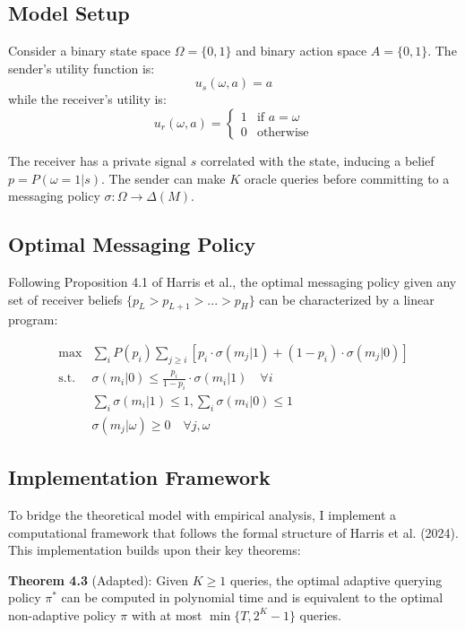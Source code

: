 \documentclass[12pt]{article}
\begin{document}
\subsection{Model Setup}
Consider a binary state space $\Omega = \{0,1\}$ and binary action space $A = \{0,1\}$. The sender's utility function is:
\begin{equation}
    u_s(\omega,a) = a
\end{equation}
while the receiver's utility is:
\begin{equation}
    u_r(\omega,a) = \begin{cases}
        1 & \text{if } a = \omega \\
        0 & \text{otherwise}
    \end{cases}
\end{equation}

The receiver has a private signal $s$ correlated with the state, inducing a belief $p = P(\omega=1|s)$. The sender can make $K$ oracle queries before committing to a messaging policy $\sigma: \Omega \rightarrow \Delta(M)$.

\subsection{Optimal Messaging Policy}
Following Proposition 4.1 of Harris et al., the optimal messaging policy given any set of receiver beliefs $\{p_L > p_{L+1} > ... > p_H\}$ can be characterized by a linear program:

\begin{align*}
    \max &\sum_i P(p_i) \sum_{j\geq i} [p_i\cdot\sigma(m_j|1) + (1-p_i)\cdot\sigma(m_j|0)] \\
    \text{s.t. } &\sigma(m_i|0) \leq \frac{p_i}{1-p_i}\cdot\sigma(m_i|1) \quad \forall i \\
    &\sum_i \sigma(m_i|1) \leq 1, \sum_i \sigma(m_i|0) \leq 1 \\
    &\sigma(m_j|\omega) \geq 0 \quad \forall j,\omega
\end{align*}

\subsection{Implementation Framework}
To bridge the theoretical model with empirical analysis, I implement a computational framework that follows the formal structure of Harris et al. (2024). This implementation builds upon their key theorems:

\textbf{Theorem 4.3} (Adapted): Given $K \geq 1$ queries, the optimal adaptive querying policy $\pi^*$ can be computed in polynomial time and is equivalent to the optimal non-adaptive policy $\pi$ with at most $\min\{T, 2^K - 1\}$ queries.
\end{document}
